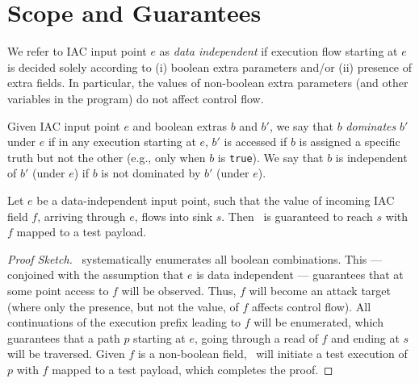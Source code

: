 \section{Scope and Guarantees}

\begin{definition} We refer to IAC input point $e$ as \emph{data independent} if execution flow starting at $e$ is decided solely according to (i) boolean extra parameters and/or (ii) presence of extra fields. In particular, the values of non-boolean extra parameters (and other variables in the program) do not affect control flow.
\end{definition}

\begin{definition} Given IAC input point $e$ and boolean extras $b$ and $b'$, we say that $b$ \emph{dominates} $b'$ under $e$ if in any execution starting at $e$, $b'$ is accessed if $b$ is assigned a specific truth but not the other (e.g., only when $b$ is {\tt true}). We say that $b$ is independent of $b'$ (under $e$) if $b$ is not dominated by $b'$ (under $e$).
\end{definition}

\begin{lemma}[Coverage] Let $e$ be a data-independent input point, such that the value of incoming IAC field $f$, arriving through $e$, flows into sink $s$. Then \Tool\ is guaranteed to reach $s$ with $f$ mapped to a test payload.
	\begin{proof}[Proof Sketch] \Tool\ systematically enumerates all boolean combinations. This --- conjoined with the assumption that $e$ is data independent --- guarantees that at some point access to $f$ will be observed. Thus, $f$ will become an attack target (where only the presence, but not the value, of $f$ affects control flow). All continuations of the execution prefix leading to $f$ will be enumerated, which guarantees that a path $p$ starting at $e$, going through a read of $f$ and ending at $s$ will be traversed. Given $f$ is a non-boolean field, \ETool\ will initiate a test execution of $p$ with $f$ mapped to a test payload, which completes the proof.
	\end{proof}
\end{lemma}